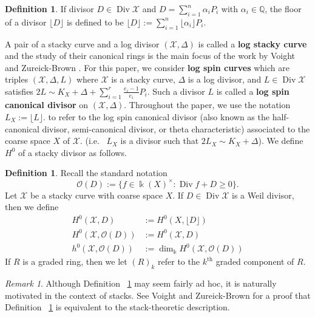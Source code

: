 \documentclass{amsart}
\theoremstyle{plain}
\theoremstyle{definition}
\newtheorem{defn}[thm]{Definition}
\theoremstyle{remark}
\newtheorem{rem}[thm]{Remark}
\numberwithin{equation}{section}
\newcommand\BQ{{\mathbb Q}}
\newcommand\Bk{{\Bbbk}}
\newcommand\sco{{\mathscr O}}
\DeclareMathOperator\di{Div}
\newcommand\sx{\mathscr X}
\newcommand{\halfcan}{L}
\begin{document}
\begin{defn}
\label{defn:divisor-floor}
If divisor $D \in \di \sx$ and $D = \sum_{i = 1}^{n} \alpha_i P_i$
with $\alpha_i \in \BQ$, the floor of a divisor $\lfloor D
\rfloor$ is defined to be $\lfloor D \rfloor := \sum_{i = 1}^{n}
\lfloor \alpha_i \rfloor P_i$.
\end{defn}

A pair of a stacky curve and a log divisor $(\sx, \Delta)$ is
called a \textbf{log stacky curve} and the study of their
canonical rings is the main focus of the work by Voight and 
Zureick-Brown \cite{vzb:stacky}. For this paper, we consider \textbf{log
spin curves} which are triples $(\sx, \Delta, \halfcan)$ where $\sx$
is a stacky curve, $\Delta$ is a log divisor, and $\halfcan \in \di
\sx$ satisfies $2 \halfcan \sim K_X + \Delta + \sum_{i = 1}^{r}
\frac{e_i - 1}{e_i} P_i$. Such a divisor $\halfcan$ is called a
\textbf{log spin canonical divisor} on $(\sx, \Delta)$. Throughout the paper, we use
the notation $\halfcan_X := \lfloor L \rfloor.$ to refer to the log spin
canonical divisor (also known as the half-canonical divisor, 
semi-canonical divisor, or theta characteristic) associated to the
coarse space $X$ of $\sx.$  (i.e.~ $\halfcan_X$ is a divisor such
that $2\halfcan_X \sim K_X + \Delta$). 
We define $H^0$ of a stacky divisor as follows.

\begin{defn}
\label{defn:h0-stacky}
Recall the standard notation 
$$\sco(D) := \{f \in \Bk(X)^\times : \di f + D \geq 0 \}.$$
Let $\sx$ be a stacky curve with coarse space $X$.
If $D \in \di \sx$ is a Weil divisor, then we define
\begin{align*}
	H^0(\sx, D) &:= H^0(X, \lfloor D \rfloor)\\
	H^0(\sx, \sco(D)) &:= H^0(\sx, D)\\
	h^0(\sx, \sco(D)) &:= \dim_\Bk H^0(\sx, \sco(D))
\end{align*}
If $R$ is a graded ring, then we let $(R)_k$ refer to the $k^\text{th}$
graded component of $R$.

\end{defn}

\begin{rem}
Although Definition ~\ref{defn:h0-stacky} may seem fairly ad hoc, it is naturally motivated in the context of stacks. See Voight and Zureick-Brown \cite[Lemma 5.4.7]{vzb:stacky} for a proof that Definition ~\ref{defn:h0-stacky} is equivalent to the stack-theoretic description.
\end{rem}
\end{document}
